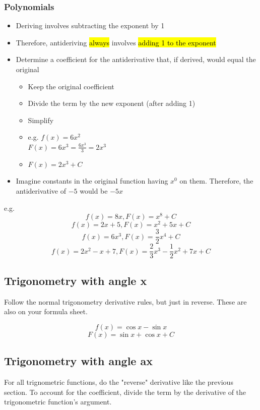 \documentclass[a4paper,12pt]{article}
\begin{document}
\subsubsection{Polynomials}
\begin{itemize}
    \item{Deriving involves subtracting the exponent by 1}
    \item{Therefore, antideriving \hl{always} involves \hl{adding 1 to the exponent}}
    \item{Determine a coefficient for the antiderivative that, if derived, would equal the original
            \begin{itemize}
                \item{Keep the original coefficient}
                \item{Divide the term by the new exponent (after adding 1)}
                \item{Simplify}
                \item{e.g. $f(x) = 6x^2$\\$F(x) = 6x^3 = \frac{6x^3}{3} = 2x^3$}
                \item{$F(x) = 2x^3 + C$}
            \end{itemize}
        }
    \item{Imagine constants in the original function having $x^0$ on them. Therefore, the antiderivative of $-5$ would be $-5x$}
\end{itemize}

e.g.
$$f(x) = 8x, F(x) = x^8 + C$$
$$f(x) = 2x + 5, F(x) = x^2 + 5x + C$$
$$f(x) = 6x^3, F(x) = \frac{3}{2}x^4 + C$$
$$f(x) = 2x^2 - x + 7, F(x) = \frac{2}{3}x^3 - \frac{1}{2}x^2 + 7x + C$$

\subsection{Trigonometry with angle x}
Follow the normal trigonometry derivative rules, but just in reverse. These are also on your formula sheet.

$$f(x) = \cos{x} - \sin{x}$$
$$F(x) = \sin{x} + \cos{x} + C$$

\subsection{Trigonometry with angle ax}
For all trignometric functions, do the "reverse" derivative like the previous section.
To account for the coefficient, divide the term by the derivative of the trigonometric function's argument.
\end{document}
